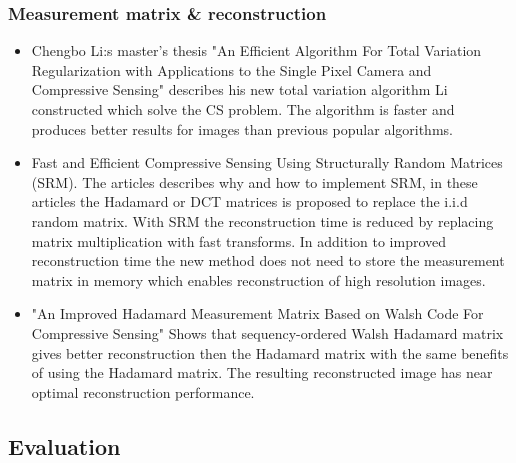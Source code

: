 \subsubsection{Measurement matrix \& reconstruction}

\begin{itemize}
    
    \item \cite{article:TVAL3} Chengbo Li:s master's thesis "An Efficient Algorithm For Total Variation Regularization with Applications to the Single Pixel Camera and Compressive Sensing" describes his new total variation algorithm Li constructed which solve the CS problem. The algorithm is faster and produces better results for images than previous popular algorithms.   

    \item \cite{article:SRM_short, article:SRM_long, article:SRM_block} Fast and Efficient Compressive Sensing Using Structurally Random Matrices (SRM). The articles describes why and how to implement SRM, in these articles the Hadamard or DCT matrices is proposed to replace the i.i.d random matrix. With SRM the reconstruction time is reduced by replacing matrix multiplication with fast transforms. In addition to improved reconstruction time the new method does not need to store the measurement matrix in memory which enables reconstruction of high resolution images. 

	\item \cite{article:an_improved_WH_matrix} "An Improved Hadamard Measurement Matrix Based on Walsh Code For Compressive Sensing" Shows that sequency-ordered Walsh Hadamard matrix gives better reconstruction then the Hadamard matrix with the same benefits of using the Hadamard matrix. The resulting reconstructed image has near optimal reconstruction performance.

\end{itemize}


\subsection{Evaluation}

